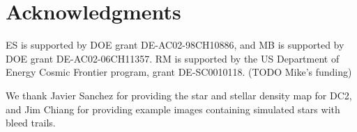 \documentclass[iop, twocolappendix, appendixfloats, numberedappendix, apj]{hackemulateapj}
\begin{document}
\section*{Acknowledgments}

ES is supported by DOE grant DE-AC02-98CH10886, and MB is supported by DOE
grant DE-AC02-06CH11357.  RM is supported by the US Department of Energy Cosmic
Frontier program, grant DE-SC0010118.  (TODO Mike's funding)

We thank Javier Sanchez for providing the star and stellar density map for DC2,
and Jim Chiang for providing example images containing simulated stars
with bleed trails.


%
%
%
%


\end{document}
